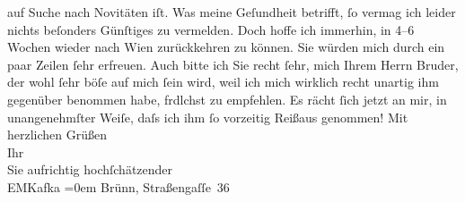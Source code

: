 \begin{ledgroupsized}[t]{13cm}
               auf Suche \introOben{}nach Novitäten\introOben{} iſt.\pend
           \pstart
           Was meine Geſundheit betrifft, ſo vermag ich leider nichts beſonders Günſtiges zu
               vermelden. Doch hoffe ich immerhin, in 4–6 Wochen wieder nach Wien zurückkehren zu können.\pend
           \pstart
           Sie würden mich durch ein paar Zeilen ſehr erfreuen. Auch bitte ich Sie recht ſehr,
               mich Ihrem Herrn Bruder, der
               wohl ſehr böſe auf mich ſein wird, weil ich mich wirklich recht unartig ihm gegenüber
               benommen habe, frdlchst zu empfehlen. Es rächt ſich jetzt an mir, in unangenehmſter
               Weiſe, daſs ich ihm ſo vorzeitig Reißaus genommen!\pend
           \pstart
           Mit herzlichen Grüßen{\\[\baselineskip]}Ihr{\\[\baselineskip]}Sie aufrichtig hochſchätzender{\\[\baselineskip]}\spacefill\mbox{EMKafka}\pend
           \leftskip=0em{}\pstart
           \noindent{}Brünn, Straßengaſſe 36\pend
           \pstart
           \label{T_L00037_1v}\label{T_L00037_1h}\pend
           
         
         \endnumbering{}\end{ledgroupsized}  \newcommand{\dateiname}{L00037}\newcommand{\titel}{Eduard Michael Kafka an Arthur Schnitzler, 30. 8. 1891}\newcommand{\editorInnen}{Martin Anton Müller und Gerd-Hermann Susen}
      